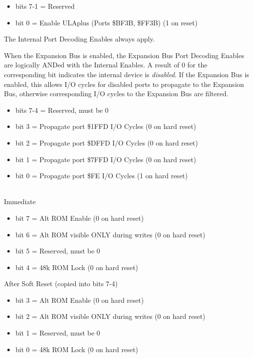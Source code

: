 \begin{itemize}
\item bits 7-1 = Reserved
\item bit 0 = Enable ULAplus (Ports \$BF3B, \$FF3B) (1 on reset)
\end{itemize}

The Internal Port Decoding Enables always apply.

When the Expansion Bus is enabled, the Expansion Bus Port Decoding
Enables are logically ANDed with the Internal Enables. A result of 0
for the corresponding bit indicates the internal device is
\emph{disabled}. If the Expansion Bus is enabled, this allows
I/O cycles for disabled ports to propagate to the Expansion Bus,
otherwise corresponding I/O cycles to the Expansion Bus are filtered.

\begin{itemize}
\item bits 7-4 = Reserved, must be 0
\item bit 3 = Propagate port \$1FFD I/O Cycles (0 on hard reset)
\item bit 2 = Propagate port \$DFFD I/O Cycles (0 on hard reset)
\item bit 1 = Propagate port \$7FFD I/O Cycles (0 on hard reset)
\item bit 0 = Propagate port \$FE I/O Cycles (1 on hard reset)
\end{itemize}

\\
Immediate
\begin{itemize}
\item bit 7 = Alt ROM Enable (0 on hard reset)
\item bit 6 = Alt ROM visible ONLY during writes (0 on hard reset)
\item bit 5 = Reserved, must be 0
\item bit 4 = 48k ROM Lock (0 on hard reset)
\end{itemize}
After Soft Reset (copied into bits 7-4)
\begin{itemize}
\item bit 3 = Alt ROM Enable (0 on hard reset)
\item bit 2 = Alt ROM visible ONLY during writes (0 on hard reset)
\item bit 1 = Reserved, must be 0
\item bit 0 = 48k ROM Lock (0 on hard reset)
\end{itemize}

